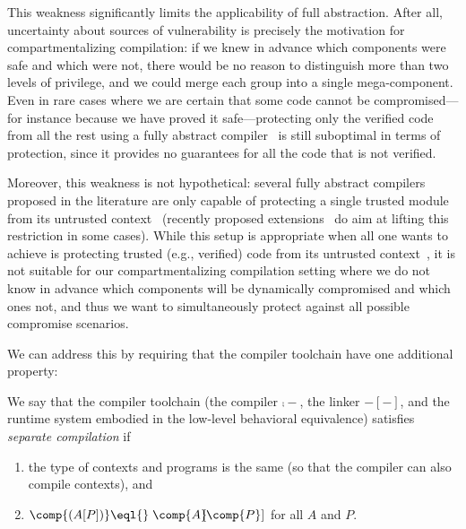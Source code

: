 \documentclass[10pt, conference, compsocconf, letterpaper, times]{IEEEtran}
\begin{document}
This weakness significantly limits the applicability of full abstraction.
After all, uncertainty about sources of vulnerability is precisely the
motivation for compartmentalizing compilation: if we knew \iffull in advance\fi
which components
were safe and which were not, there would be no reason to distinguish more
than two levels of privilege, and we could merge each group into a single
mega-component.
Even in rare cases where we are certain that some code cannot be
compromised---for instance because we have proved it
safe---protecting only the verified code from all the rest using a fully
abstract compiler~\cite{Agten0P15} is still suboptimal in terms of
protection, since it provides no guarantees for all the code that is not
verified.

Moreover, this weakness is not hypothetical:
several fully abstract compilers proposed in the literature are only
capable of protecting a single trusted module from its untrusted
context~\cite{PatrignaniASJCP15, AgtenSJP12, LarmuseauPC15,
  PatrignaniCP13, patrignani_thesis} (recently proposed
extensions~\cite{PatrignaniDP16} do aim at lifting this restriction in
some cases).
While this setup is appropriate when all one wants to achieve is
protecting trusted (e.g., verified) code
from its untrusted context~\cite{Agten0P15}, it is not suitable for
our compartmentalizing compilation setting where we do not know in advance
which components will be dynamically compromised and which ones not,
and thus we want to simultaneously protect against all possible compromise
scenarios.

\label{sec:separate-compilation}

We can address this by requiring that the compiler toolchain have one
additional property: 

\begin{defn}\label{defn:separate-compilation}
  We say that the compiler toolchain (\IE the compiler $\comp{-}$, the linker
  $-[-]$, and the runtime system embodied in the low-level behavioral
  equivalence) satisfies {\em separate compilation} if
\begin{enumerate}
\item the type of contexts and programs is the same (so that the
  compiler can also compile contexts), and
\item $\comp{(A[P])} \eql{}\; \comp{A}\hspace{-0.35em}[\comp{P}]$ for all
$A$ and $P$.
\end{enumerate}
\end{defn}
\end{document}
